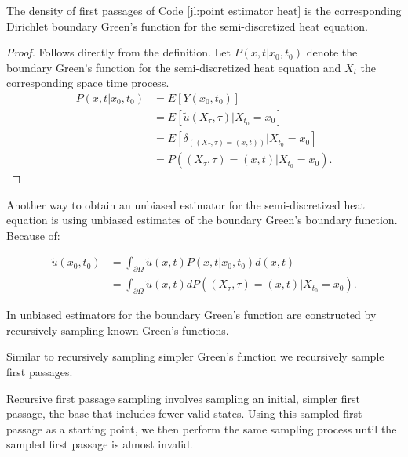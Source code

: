 \documentclass[a4paper,12pt]{article}
\begin{document}
\begin{theorem}
  The density of first passages of Code \ref{jl:point estimator heat} is the
  corresponding Dirichlet boundary Green's function for the semi-discretized heat equation.
\end{theorem}

\begin{proof}
  Follows directly from the definition.
  Let $P(x,t|x_{0},t_{0})$ denote the boundary Green's
  function for the semi-discretized heat equation and $X_{t}$
  the corresponding space time process.
  \begin{align}
    P(x,t|x_{0},t_{0}) & = E[Y(x_0,t_0)]                                         \\
                       & = E[\tilde{u}(X_{\tau},\tau) | X_{t_0} = x_0 ]          \\
                       & = E[\delta_{((X_{\tau},\tau) = (x,t))}| X_{t_0} = x_0 ] \\
                       & = P((X_{\tau},\tau) = (x,t)| X_{t_0} = x_0 )
    .
  \end{align}
\end{proof}


Another way to obtain an unbiased estimator for the semi-discretized heat equation is using unbiased estimates
of the boundary Green's boundary function. Because of:

\begin{align}
  \tilde{u}(x_{0},t_{0}) & = \int_{\partial \Omega} \tilde{u}(x,t) P(x,t|x_{0},t_{0}) d(x,t)                    \\
                         & = \int_{\partial \Omega} \tilde{u}(x,t)  dP((X_{\tau},\tau) = (x,t)| X_{t_0} = x_0 )
  .
\end{align}

\begin{related}
  In \cite{qi_bidirectional_2022} unbiased estimators for the boundary Green's function are constructed
  by recursively sampling known Green's functions.
\end{related}

Similar to recursively  sampling simpler Green's function we recursively sample first passages.

\begin{technique}
  Recursive first passage sampling involves sampling an initial,
  simpler first passage, the base that includes fewer valid states. Using
  this sampled first passage as a starting point, we
  then perform the same sampling process until the sampled
  first passage is almost invalid.
\end{technique}
\end{document}
